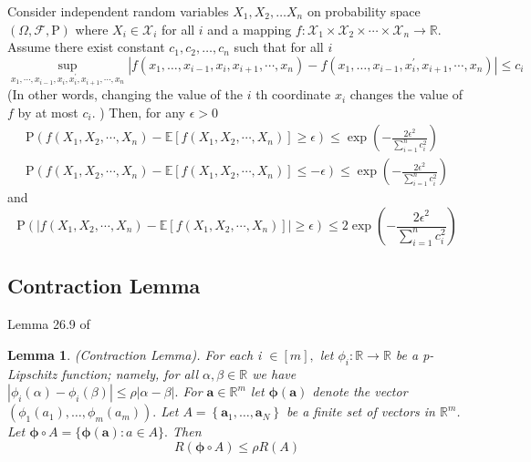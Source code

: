 \documentclass[12pt]{article}
\newtheorem{lem}[thm]{Lemma}
\theoremstyle{definition}
\begin{document}
Consider independent random variables $X_{1}, X_{2}, \ldots X_{n}$ on probability space $(\Omega, \mathcal{F}, \mathrm{P})$ where $X_{i} \in \mathcal{X}_{i}$ for all $i$ and a mapping $f: \mathcal{X}_{1} \times \mathcal{X}_{2} \times \cdots \times \mathcal{X}_{n} \rightarrow \mathbb{R}$. Assume there exist
constant $c_{1}, c_{2}, \ldots, c_{n}$ such that for all $i$
\[
\sup _{x_{1}, \cdots, x_{i-1}, x_{i}, x_{i}^{\prime}, x_{i+1}, \cdots, x_{n}}\left|f\left(x_{1}, \ldots, x_{i-1}, x_{i}, x_{i+1}, \cdots, x_{n}\right)-f\left(x_{1}, \ldots, x_{i-1}, x_{i}^{\prime}, x_{i+1}, \cdots, x_{n}\right)\right| \leq c_{i}
\]
(In other words, changing the value of the $i$ th coordinate $x_{i}$ changes the value of $f$ by at most
$c_{i} .$ ) Then, for any $\epsilon>0$
\[
\begin{array}{l}
\mathrm{P}\left(f\left(X_{1}, X_{2}, \cdots, X_{n}\right)-\mathbb{E}\left[f\left(X_{1}, X_{2}, \cdots, X_{n}\right)\right] \geq \epsilon\right) \leq \exp \left(-\frac{2 \epsilon^{2}}{\sum_{i=1}^{n} c_{i}^{2}}\right) \\
\mathrm{P}\left(f\left(X_{1}, X_{2}, \cdots, X_{n}\right)-\mathbb{E}\left[f\left(X_{1}, X_{2}, \cdots, X_{n}\right)\right] \leq-\epsilon\right) \leq \exp \left(-\frac{2 \epsilon^{2}}{\sum_{i=1}^{n} c_{i}^{2}}\right)
\end{array}
\]
and
\[
\mathrm{P}\left(\left|f\left(X_{1}, X_{2}, \cdots, X_{n}\right)-\mathbb{E}\left[f\left(X_{1}, X_{2}, \cdots, X_{n}\right)\right]\right| \geq \epsilon\right) \leq 2 \exp \left(-\frac{2 \epsilon^{2}}{\sum_{i=1}^{n} c_{i}^{2}}\right)
\]

\subsection{Contraction Lemma}
Lemma 26.9 of \cite{shalev2014understanding}
\begin{lem}
	(Contraction Lemma). For each i $\in[m],$ let $\phi_{i}: \mathbb{R} \rightarrow \mathbb{R}$ be a p-Lipschitz function; namely, for all $\alpha, \beta \in \mathbb{R}$ we have $\left|\phi_{i}(\alpha)-\phi_{i}(\beta)\right| \leq \rho|\alpha-\beta| .$ For $\mathbf{a} \in \mathbb{R}^{m}$ let
	$\boldsymbol{\phi}(\mathbf{a})$ denote the vector $\left(\phi_{1}\left(a_{1}\right), \ldots, \phi_{m}\left(a_{m}\right)\right) .$ 
	Let $A=\left\{\mathbf{a}_{1}, \ldots, \mathbf{a}_{N}\right\}$ be a finite set of vectors in $\mathbb{R}^{m}$.
	Let $\boldsymbol{\phi} \circ A=\{\boldsymbol{\phi}(\mathbf{a}): a \in A\} .$ Then
	\[
	R(\boldsymbol{\phi} \circ A) \leq \rho R(A)
	\]
\end{lem}
\end{document}
